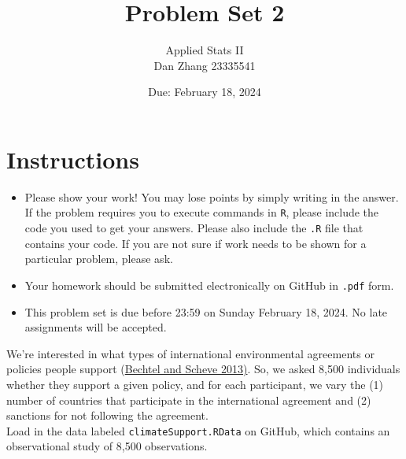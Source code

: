 \documentclass[12pt,letterpaper]{article}
\title{Problem Set 2}
\date{Due: February 18, 2024}
\author{Applied Stats II \\  Dan Zhang 23335541}
\begin{document}
	\maketitle
	\section*{Instructions}
	\begin{itemize}
		\item Please show your work! You may lose points by simply writing in the answer. If the problem requires you to execute commands in \texttt{R}, please include the code you used to get your answers. Please also include the \texttt{.R} file that contains your code. If you are not sure if work needs to be shown for a particular problem, please ask.
		\item Your homework should be submitted electronically on GitHub in \texttt{.pdf} form.
		\item This problem set is due before 23:59 on Sunday February 18, 2024. No late assignments will be accepted.
	\end{itemize}

	
	

	\vspace{.25cm}
\noindent We're interested in what types of international environmental agreements or policies people support (\href{https://www.pnas.org/content/110/34/13763}{Bechtel and Scheve 2013)}. So, we asked 8,500 individuals whether they support a given policy, and for each participant, we vary the (1) number of countries that participate in the international agreement and (2) sanctions for not following the agreement. \\

\noindent Load in the data labeled \texttt{climateSupport.RData} on GitHub, which contains an observational study of 8,500 observations.
\end{document}
